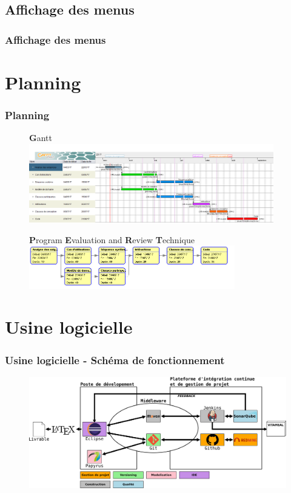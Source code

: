 \documentclass{beamer}
\begin{document}
\subsection{Affichage des menus}
\begin{frame}
\frametitle{Affichage des menus}

\end{frame}

\section{Planning}
\begin{frame}[label=planning]
\frametitle{Planning}
\begin{figure}[H]
\textbf{G}antt
\label{Gantt}
  \centering
      \includegraphics[width=0.95\textwidth]{Vitameal_gantt.png} %
\end{figure}

\begin{figure}[H]
\textbf{P}rogram \textbf{E}valuation and \textbf{R}eview \textbf{T}echnique
\label{PERT}
  \centering
      \includegraphics[width=0.8\textwidth]{Vitameal_pert.png} %
\end{figure}
\end{frame}

\section{Usine logicielle}
\begin{frame}[label=schemaFonctionnement]
  \frametitle{Usine logicielle - Schéma de fonctionnement}
\begin{figure}[H]
\label{schema}
  \centering
      \includegraphics[width=1.0\textwidth]{usine_vitameal.png} %
\end{figure}
\end{frame}
\end{document}
